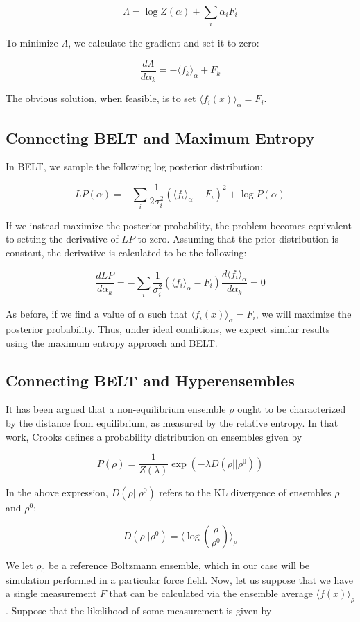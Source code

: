 \documentclass[12pt]{article}
\begin{document}
$$\Lambda = \log Z(\alpha) + \sum_i \alpha_i F_i$$

To minimize $\Lambda$, we calculate the gradient and set it to zero:

$$\frac{d\Lambda}{d\alpha_k} = -\langle f_k \rangle_\alpha + F_k$$

The obvious solution, when feasible, is to set $\langle f_i(x) \rangle_\alpha = F_i$.  


\subsection*{Connecting BELT and Maximum Entropy}


In BELT, we sample the following log posterior distribution:

$$LP(\alpha) = -\sum_i \frac{1}{2\sigma_i^2}(\langle f_i\rangle _\alpha - F_i)^2 + \log P(\alpha)$$

If we instead maximize the posterior probability, the problem becomes equivalent to setting the derivative of $LP$ to zero.  Assuming that the prior distribution is constant, the derivative is calculated to be the following:

$$ \frac{dLP}{d\alpha_k} =  -\sum_i \frac{1}{\sigma_i^2} (\langle f_i\rangle _\alpha - F_i) \frac{d\langle f_i\rangle _\alpha}{d\alpha_k} = 0$$

As before, if we find a value of $\alpha$ such that $\langle f_i(x) \rangle_\alpha = F_i$, we will maximize the posterior probability.  Thus, under ideal conditions, we expect similar results using the maximum entropy approach and BELT.  

\subsection*{Connecting BELT and Hyperensembles}

It has been argued \cite{crooks2007beyond} that a non-equilibrium ensemble $\rho$ ought to be characterized by the distance from equilibrium, as measured by the relative entropy.  In that work, Crooks defines a probability distribution on ensembles given by 

$$P(\rho) = \frac{1}{Z(\lambda)} \exp(- \lambda D(\rho || \rho^0))$$

In the above expression, $D(\rho || \rho^0)$ refers to the KL divergence of ensembles $\rho$ and $\rho^0$:

$$D(\rho || \rho^0) = \langle \log(\frac{\rho}{\rho^0})\rangle_\rho$$

We let $\rho_0$ be a reference Boltzmann ensemble, which in our case will be simulation performed in a particular force field. Now, let us suppose that we have a single measurement $F$ that can be calculated via the ensemble average $\langle f(x) \rangle_\rho$.  Suppose that the likelihood of some measurement is given by
\end{document}
